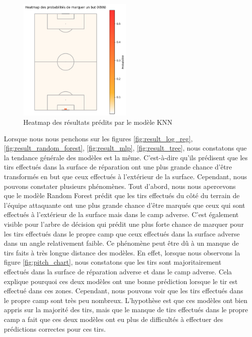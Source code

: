 \documentclass[12pt]{article}
\begin{document}
\begin{figure}[htp]
    \centering
    \includegraphics[width=0.5\textwidth]{img/pitch_visualisation_knn.png}
    \caption{Heatmap des résultats prédits par le modèle KNN}
    \label{fig:result_knn}
\end{figure}
\newpage
Lorsque nous nous penchons sur les figures \ref{fig:result_log_reg}, \ref{fig:result_random_forest}, \ref{fig:result_mlp}, \ref{fig:result_tree}, nous constatons que la tendance générale des modèles est la même.
C'est-à-dire qu'ils prédisent que les tirs effectués dans la surface de réparation ont une plus grande chance d'être transformés en but que ceux effectués à l'extérieur de la surface.
Cependant, nous pouvons constater plusieurs phénomènes.
Tout d'abord, nous nous apercevons que le modèle Random Forest prédit que les tirs effectués du côté du terrain de l'équipe attaquante ont une plus grande chance d'être marqués que ceux qui sont effectués à l'extérieur de la surface mais dans le camp adverse.
C'est également visible pour l'arbre de décision qui prédit une plus forte chance de marquer pour les tirs effectués dans le propre camp que ceux effectués dans la surface adverse dans un angle relativement faible.
Ce phénomène peut être dû à un manque de tirs faits à très longue distance des modèles.
En effet, lorsque nous observons la figure \ref{fig:pitch_chart}, nous constatons que les tirs sont majoritairement effectués dans la surface de réparation adverse et dans le camp adverse.
Cela explique pourquoi ces deux modèles ont une bonne prédiction lorsque le tir est effectué dans ces zones.
Cependant, nous pouvons voir que les tirs effectués dans le propre camp sont très peu nombreux.
L'hypothèse est que ces modèles ont bien appris sur la majorité des tirs, mais que le manque de tirs effectués dans le propre camp a fait que ces deux modèles ont eu plus de difficultés à effectuer des prédictions correctes pour ces tirs.
\end{document}
